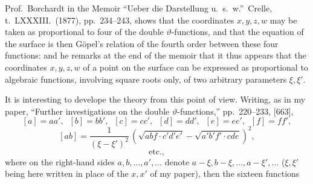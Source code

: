 \documentclass[11pt,a4paper]{article}
\begin{document}
\medskip

\noindent Prof.\ Borchardt in the Memoir ``Ueber die Darstellung u.~s.~w.''\ Crelle, t.~LXXXIII.\ (1877), pp.~234--243, shows that the coordinates $x, y, z, w$ may be taken as proportional to four of the double $\vartheta$-functions, and that the equation of the surface is then G\"opel's relation of the fourth order between these four functions: and he remarks at the end of the memoir that it thus appears that the coordinates $x, y, z, w$ of a point on the surface can be expressed as proportional to algebraic functions, involving square roots only, of two arbitrary parameters $\xi, \xi'$.

\medskip

It is interesting to develope the theory from this point of view. Writing, as in my paper, ``Further investigations on the double $\vartheta$-functions,'' pp.~220--233, [663],
\[
[a] = aa',\;\; [b] = bb',\;\; [c] = cc',\;\; [d] = dd',\;\; [e] = ee',\;\; [f] = ff',
\]
\[
[ab] = \frac{1}{(\xi - \xi')^{2}}\,(\sqrt{abf \cdot c'd'e'} - \sqrt{a'b'f' \cdot cde})^{2},
\]
\[
\text{etc.},
\]
where on the right-hand sides $a, b, \ldots, a', \ldots$ denote $a - \xi, b - \xi, \ldots, a - \xi', \ldots$ ($\xi, \xi'$ being here written in place of the $x, x'$ of my paper), then the sixteen functions
\end{document}
